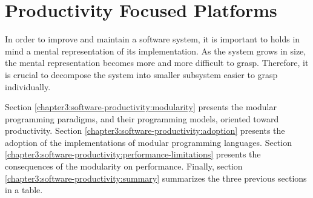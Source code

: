 \section{Productivity Focused Platforms} \label{chapter3:software-productivity}



In order to improve and maintain a software system, it is important to holds in mind a mental representation of its implementation.
As the system grows in size, the mental representation becomes more and more difficult to grasp.
Therefore, it is crucial to decompose the system into smaller subsystem easier to grasp individually.



Section \ref{chapter3:software-productivity:modularity} presents the modular programming paradigms, and their programming models, oriented toward productivity.
Section \ref{chapter3:software-productivity:adoption} presents the adoption of the implementations of modular programming languages.
Section \ref{chapter3:software-productivity:performance-limitations} presents the consequences of the modularity on performance.
Finally, section \ref{chapter3:software-productivity:summary} summarizes the three previous sections in a table.

